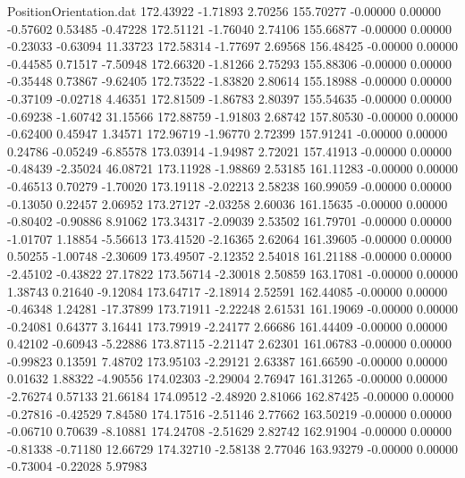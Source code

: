 \begin{filecontents}{PositionOrientation.dat}
 172.43922   -1.71893    2.70256   155.70277   -0.00000    0.00000   -0.57602    0.53485   -0.47228
 172.51121   -1.76040    2.74106   155.66877   -0.00000    0.00000   -0.23033   -0.63094   11.33723
 172.58314   -1.77697    2.69568   156.48425   -0.00000    0.00000   -0.44585    0.71517   -7.50948
 172.66320   -1.81266    2.75293   155.88306   -0.00000    0.00000   -0.35448    0.73867   -9.62405
 172.73522   -1.83820    2.80614   155.18988   -0.00000    0.00000   -0.37109   -0.02718    4.46351
 172.81509   -1.86783    2.80397   155.54635   -0.00000    0.00000   -0.69238   -1.60742   31.15566
 172.88759   -1.91803    2.68742   157.80530   -0.00000    0.00000   -0.62400    0.45947    1.34571
 172.96719   -1.96770    2.72399   157.91241   -0.00000    0.00000    0.24786   -0.05249   -6.85578
 173.03914   -1.94987    2.72021   157.41913   -0.00000    0.00000   -0.48439   -2.35024   46.08721
 173.11928   -1.98869    2.53185   161.11283   -0.00000    0.00000   -0.46513    0.70279   -1.70020
 173.19118   -2.02213    2.58238   160.99059   -0.00000    0.00000   -0.13050    0.22457    2.06952
 173.27127   -2.03258    2.60036   161.15635   -0.00000    0.00000   -0.80402   -0.90886    8.91062
 173.34317   -2.09039    2.53502   161.79701   -0.00000    0.00000   -1.01707    1.18854   -5.56613
 173.41520   -2.16365    2.62064   161.39605   -0.00000    0.00000    0.50255   -1.00748   -2.30609
 173.49507   -2.12352    2.54018   161.21188   -0.00000    0.00000   -2.45102   -0.43822   27.17822
 173.56714   -2.30018    2.50859   163.17081   -0.00000    0.00000    1.38743    0.21640   -9.12084
 173.64717   -2.18914    2.52591   162.44085   -0.00000    0.00000   -0.46348    1.24281  -17.37899
 173.71911   -2.22248    2.61531   161.19069   -0.00000    0.00000   -0.24081    0.64377    3.16441
 173.79919   -2.24177    2.66686   161.44409   -0.00000    0.00000    0.42102   -0.60943   -5.22886
 173.87115   -2.21147    2.62301   161.06783   -0.00000    0.00000   -0.99823    0.13591    7.48702
 173.95103   -2.29121    2.63387   161.66590   -0.00000    0.00000    0.01632    1.88322   -4.90556
 174.02303   -2.29004    2.76947   161.31265   -0.00000    0.00000   -2.76274    0.57133   21.66184
 174.09512   -2.48920    2.81066   162.87425   -0.00000    0.00000   -0.27816   -0.42529    7.84580
 174.17516   -2.51146    2.77662   163.50219   -0.00000    0.00000   -0.06710    0.70639   -8.10881
 174.24708   -2.51629    2.82742   162.91904   -0.00000    0.00000   -0.81338   -0.71180   12.66729
 174.32710   -2.58138    2.77046   163.93279   -0.00000    0.00000   -0.73004   -0.22028    5.97983

\end{filecontents}

